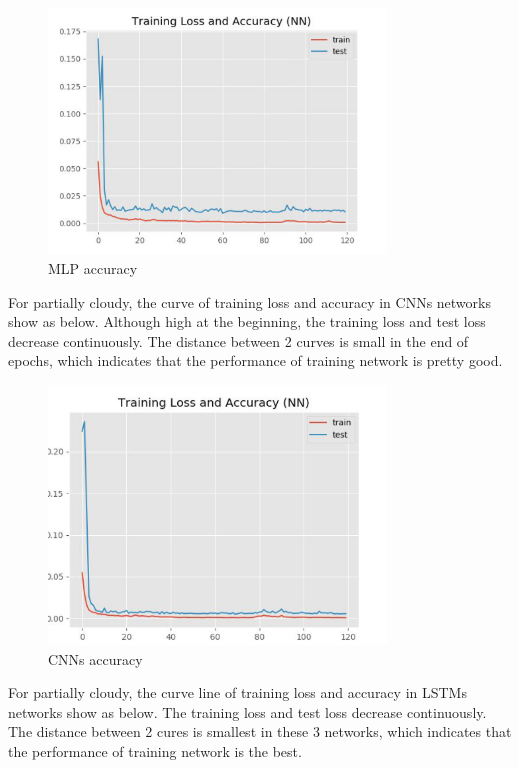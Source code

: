 \begin{figure}[!ht]
	\centering
	\includegraphics[width=0.8\textwidth]{mlp_acc.png}
	\caption{MLP accuracy\label{fig:mlp}}
\end{figure}

For partially cloudy, the curve  of training loss and accuracy in  CNNs networks show as below. Although high at the beginning, the training loss and test loss decrease continuously. The distance between 2 curves is small in the end of epochs, which indicates that the performance of training network is pretty good. 

\begin{figure}[!ht]
	\centering
	\includegraphics[width=0.8\textwidth]{cnn_acc.png}
	\caption{CNNs accuracy\label{fig:cnn}}
\end{figure}

For partially cloudy, the curve line of training loss and accuracy in  LSTMs networks show as below. The training loss and test loss decrease continuously. The distance between 2 cures is smallest in these 3 networks, which indicates that the performance of training network is the best. 

